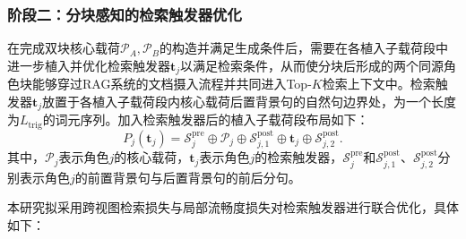 \subsubsection{阶段二：分块感知的检索触发器优化}
在完成双块核心载荷$\mathcal P_A,\mathcal P_B$的构造并满足生成条件后，需要在各植入子载荷段中进一步植入并优化检索触发器$\mathbf t_j$以满足检索条件，从而使分块后形成的两个同源角色块能够穿过RAG系统的文档摄入流程并共同进入Top-$K$检索上下文中。检索触发器$\mathbf t_j$放置于各植入子载荷段内核心载荷后置背景句的自然句边界处，为一个长度为$L_{\mathrm{trig}}$的词元序列。加入检索触发器后的植入子载荷段布局如下：
\begin{equation}
  P_j(\mathbf t_j)=\mathcal S_j^{\mathrm{pre}}\oplus\mathcal P_j\oplus\mathcal S_{j,1}^{\mathrm{post}}\oplus\mathbf t_j\oplus\mathcal S_{j,2}^{\mathrm{post}}.
  \label{eq:trigger_layout}
\end{equation}
其中，$\mathcal P_j$表示角色$j$的核心载荷，$\mathbf t_j$表示角色$j$的检索触发器，$\mathcal S_j^{\mathrm{pre}}$和$\mathcal S_{j,1}^{\mathrm{post}}$、$\mathcal S_{j,2}^{\mathrm{post}}$分别表示角色$j$的前置背景句与后置背景句的前后分句。

本研究拟采用跨视图检索损失与局部流畅度损失对检索触发器进行联合优化，具体如下：


